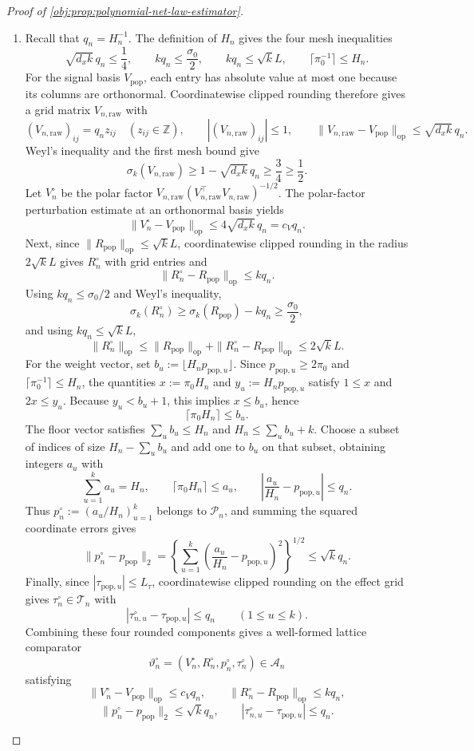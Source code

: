 \begin{proof}[Proof of \cref{obj:prop:polynomial-net-law-estimator}]
\begin{enumerate}
\item Recall that \(q_n=H_n^{-1}\).  The definition of \(H_n\) gives the four mesh inequalities
\[
\sqrt{d_xk}\,q_n\le\frac14,
\qquad
kq_n\le\frac{\sigma_0}{2},
\qquad
kq_n\le\sqrt{k}L,
\qquad
\lceil\pi_0^{-1}\rceil\le H_n .
\]
For the signal basis \(V_{\mathrm{pop}}\), each entry has absolute value at most one because its columns are orthonormal.  Coordinatewise clipped rounding therefore gives a grid matrix \(V_{n,\mathrm{raw}}\) with
\[
(V_{n,\mathrm{raw}})_{ij}=q_n z_{ij}\quad (z_{ij}\in\mathbb Z),
\qquad |(V_{n,\mathrm{raw}})_{ij}|\le1,
\qquad
\|V_{n,\mathrm{raw}}-V_{\mathrm{pop}}\|_{\mathrm{op}}
\le \sqrt{d_xk}\,q_n .
\]
Weyl's inequality and the first mesh bound give
\[
\sigma_k(V_{n,\mathrm{raw}})\ge1-\sqrt{d_xk}\,q_n\ge\frac34\ge\frac12 .
\]
Let \(V_n^\circ\) be the polar factor \(V_{n,\mathrm{raw}}(V_{n,\mathrm{raw}}^\top V_{n,\mathrm{raw}})^{-1/2}\).  The polar-factor perturbation estimate at an orthonormal basis yields
\[
\|V_n^\circ-V_{\mathrm{pop}}\|_{\mathrm{op}}
\le4\sqrt{d_xk}\,q_n=c_Vq_n .
\]
Next, since \(\|R_{\mathrm{pop}}\|_{\mathrm{op}}\le\sqrt{k}L\), coordinatewise clipped rounding in the radius \(2\sqrt{k}L\) gives \(R_n^\circ\) with grid entries and
\[
\|R_n^\circ-R_{\mathrm{pop}}\|_{\mathrm{op}}\le kq_n .
\]
Using \(kq_n\le\sigma_0/2\) and Weyl's inequality,
\[
\sigma_k(R_n^\circ)\ge\sigma_k(R_{\mathrm{pop}})-kq_n
\ge\frac{\sigma_0}{2},
\]
and using \(kq_n\le\sqrt{k}L\),
\[
\|R_n^\circ\|_{\mathrm{op}}
\le \|R_{\mathrm{pop}}\|_{\mathrm{op}}+\|R_n^\circ-R_{\mathrm{pop}}\|_{\mathrm{op}}
\le2\sqrt{k}L .
\]
For the weight vector, set \(b_u:=\lfloor H_np_{\mathrm{pop},u}\rfloor\).  Since \(p_{\mathrm{pop},u}\ge2\pi_0\) and \(\lceil\pi_0^{-1}\rceil\le H_n\), the quantities \(x:=\pi_0H_n\) and \(y_u:=H_np_{\mathrm{pop},u}\) satisfy \(1\le x\) and \(2x\le y_u\).  Because \(y_u< b_u+1\), this implies \(x\le b_u\), hence
\[
\lceil\pi_0H_n\rceil\le b_u .
\]
The floor vector satisfies \(\sum_u b_u\le H_n\) and \(H_n\le\sum_u b_u+k\).  Choose a subset of indices of size \(H_n-\sum_u b_u\) and add one to \(b_u\) on that subset, obtaining integers \(a_u\) with
\[
\sum_{u=1}^k a_u=H_n,
\qquad
\lceil\pi_0H_n\rceil\le a_u,
\qquad
\left|\frac{a_u}{H_n}-p_{\mathrm{pop},u}\right|\le q_n .
\]
Thus \(p_n^\circ:=(a_u/H_n)_{u=1}^k\) belongs to \(\mathcal P_n\), and summing the squared coordinate errors gives
\[
\|p_n^\circ-p_{\mathrm{pop}}\|_2
=\left\{\sum_{u=1}^k\left(\frac{a_u}{H_n}-p_{\mathrm{pop},u}\right)^2\right\}^{1/2}
\le\sqrt{k}q_n .
\]
Finally, since \(|\tau_{\mathrm{pop},u}|\le L_\tau\), coordinatewise clipped rounding on the effect grid gives \(\tau_n^\circ\in\mathcal T_n\) with
\[
|\tau_{n,u}^\circ-\tau_{\mathrm{pop},u}|\le q_n
\qquad(1\le u\le k).
\]
Combining these four rounded components gives a well-formed lattice comparator
\[
\vartheta_n^\circ=(V_n^\circ,R_n^\circ,p_n^\circ,\tau_n^\circ)\in\mathcal A_n
\]
satisfying
\[
\|V_n^\circ-V_{\mathrm{pop}}\|_{\mathrm{op}}\le c_Vq_n,\qquad
\|R_n^\circ-R_{\mathrm{pop}}\|_{\mathrm{op}}\le kq_n,
\]
\[
\|p_n^\circ-p_{\mathrm{pop}}\|_2\le\sqrt{k}q_n,\qquad
|\tau_{n,u}^\circ-\tau_{\mathrm{pop},u}|\le q_n .
\] %


\end{enumerate}
\end{proof}
